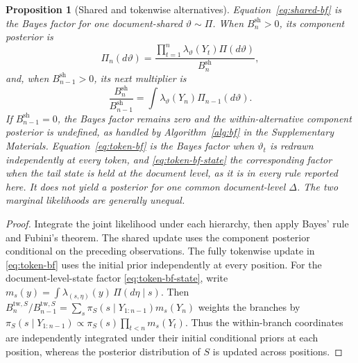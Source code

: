 \documentclass[11pt]{article}
\newtheorem{proposition}{Proposition}
\begin{document}
\begin{proposition}[Shared and tokenwise alternatives]\label{prop:hierarchy}
Equation~\eqref{eq:shared-bf} is the Bayes factor for one document-shared $\vartheta\sim\Pi$.  When $B_n^{\mathrm{sh}}>0$, its component posterior is
\begin{equation}
  \Pi_n(d\vartheta)
  =\frac{\prod_{t=1}^n\lambda_\vartheta(Y_t)\Pi(d\vartheta)}{B_n^{\mathrm{sh}}},
\end{equation}
and, when $B_{n-1}^{\mathrm{sh}}>0$, its next multiplier is
\begin{equation}
  \frac{B_n^{\mathrm{sh}}}{B_{n-1}^{\mathrm{sh}}}
  =\int\lambda_\vartheta(Y_n)\Pi_{n-1}(d\vartheta).
\end{equation}
If $B_{n-1}^{\mathrm{sh}}=0$, the Bayes factor remains zero and the within-alternative component posterior is undefined, as handled by Algorithm~\ref{alg:bf} in the Supplementary Materials.  Equation~\eqref{eq:token-bf} is the Bayes factor when $\vartheta_t$ is redrawn independently at every token, and \eqref{eq:token-bf-state} the corresponding factor when the tail state is held at the document level, as it is in every rule reported here.  It does not yield a posterior for one common document-level $\Delta$.  The two marginal likelihoods are generally unequal.
\end{proposition}

\begin{proof}
Integrate the joint likelihood under each hierarchy, then apply Bayes' rule and Fubini's theorem.  The shared update uses the component posterior conditional on the preceding observations.  The fully tokenwise update in \eqref{eq:token-bf} uses the initial prior independently at every position.  For the document-level-state factor \eqref{eq:token-bf-state}, write $m_s(y)=\int\lambda_{(s,\eta)}(y)\,\Pi(d\eta\mid s)$.  Then $B_n^{\mathrm{tw},S}/B_{n-1}^{\mathrm{tw},S}=\sum_s\pi_S(s\mid Y_{1:n-1})m_s(Y_n)$ weights the branches by $\pi_S(s\mid Y_{1:n-1})\propto\pi_S(s)\prod_{t<n}m_s(Y_t)$.  Thus the within-branch coordinates are independently integrated under their initial conditional priors at each position, whereas the posterior distribution of $S$ is updated across positions.
\end{proof}
\end{document}
